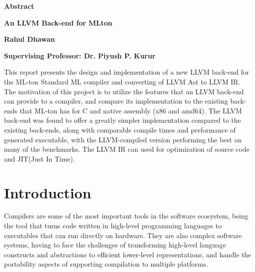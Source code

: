 \documentclass{book}
\begin{document}
\thispagestyle{plain}
\begin{center}
    
    \huge{\textbf{Abstract}}
 
    \vspace{0.4cm}
    \large
    \textbf{An LLVM Back-end for MLton}
    
    \vspace{0.4cm}
    \textbf{Rahul Dhawan}
 
    \vspace{0.4cm}
    \textbf{Supervising Professor: Dr. Piyush P. Kurur }
    
    \vspace{1.0cm}
    \justify
    This report presents the design and implementation of a new LLVM back-end for the ML-ton Standard ML compiler and converting of LLVM Ast to LLVM IR.  The motivation of this project is to utilize the features that an LLVM back-end can provide to a compiler, and compare its implementation to the existing back-ends that ML-ton has for C and native assembly (x86 and amd64).  The LLVM back-end was found to offer a greatly simpler implementation compared to the existing back-ends, along with comparable compile times and performance of generated executable, with the LLVM-compiled version performing the best on many of the benchmarks. The LLVM IR can used for optimization of source code and JIT(Just In Time).
\end{center}
\tableofcontents

\chapter{Introduction}
   \Large
   Compilers are some of the most important tools in the software ecosystem, being the tool
that turns code written in high-level programming languages to executables that can run directly on hardware. They are also complex software systems, having to face the challenges
of transforming high-level language constructs and abstractions to efficient lower-level representations, and handle the portability aspects of supporting compilation to multiple platforms.
\end{document}
